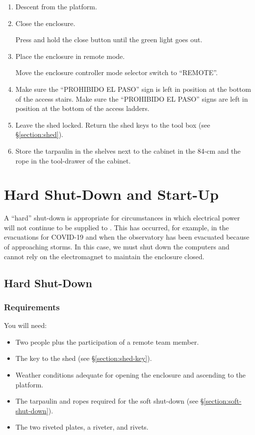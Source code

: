\begin{enumerate}
\item Descent from the platform.

\item Close the enclosure. 

Press and hold the close button until the green light goes out.

\item
Place the enclosure in remote mode.

Move the enclosure controller mode selector switch to “REMOTE”.

\item
\ifcoatli
Make sure the “PROHIBIDO EL PASO” sign is left in position at the bottom of the access stairs.
\fi
\ifddoti
Make sure the “PROHIBIDO EL PASO” signs are left in position at the bottom of the access ladders.
\fi

\item
Leave the shed locked. Return the shed keys to the tool box (see \S\ref{section:shed}).

\item
Store the tarpaulin in the shelves next to the cabinet in the 84-cm and the rope in the tool-drawer of the cabinet.

\end{enumerate}

\section{Hard Shut-Down and Start-Up}

A “hard” shut-down is appropriate for circumstances in which electrical power will not continue to be supplied to {\projectname}. This has occurred, for example, in the evacuations for COVID-19 and when the observatory has been evacuated because of approaching storms. In this case, we must shut down the computers and cannot rely on the electromagnet to maintain the enclosure closed.

\subsection{Hard Shut-Down}

\subsubsection{Requirements}

You will need:

\begin{itemize}
    \item Two people plus the participation of a remote team member.
    \item The key to the shed (see \S\ref{section:shed-key}).
    \item Weather conditions adequate for opening the enclosure and ascending to the platform.
    \item The tarpaulin and ropes required for the soft shut-down (see \S\ref{section:soft-shut-down}).
    \item The two riveted plates, a riveter, and rivets.
\end{itemize}

